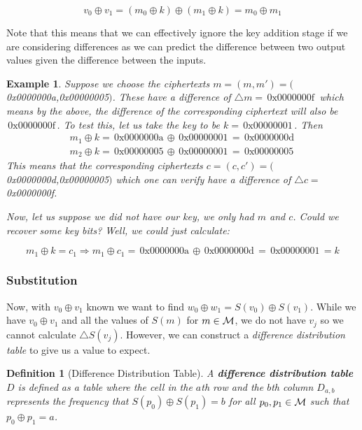 \documentclass[12pt,a4paper]{article}
\newtheorem{definition}[theorem]{Definition}
\newtheorem{example}[theorem]{Example}
\newenvironment{bigexample}{\begin{shadedbox}\begin{example}\normalfont}{\end{example}\end{shadedbox}}
\newcommand{\hex}[1] {0x#1}
\newcommand{\hexp}[1] {\,\text{0x#1}\,}
\begin{document}
\[v_0 \oplus v_1 = (m_0 \oplus k) \oplus (m_1 \oplus k)  = m_0 \oplus m_1
\]

Note that this means that we can effectively ignore the key addition stage if we are
considering differences as we can predict the difference
between two output values given the difference between the inputs. 

\begin{bigexample}
Suppose we choose the ciphertexts $m = (m,m') = ($\hex{0000000a},\hex{00000005}$)$. These have a
difference of $\triangle m = \hexp{0000000f}$ which means by the above, the difference of
the corresponding ciphertext will also be $\hexp{0000000f}$. To test this, let us take the
key to be $k=\hexp{00000001}$. Then 
\begin{align*}
m_1 \oplus k = \hexp{0000000a} \oplus \hexp{00000001} = \hexp{0000000d}\\
m_2 \oplus k =
\hexp{00000005} \oplus \hexp{00000001} = \hexp{00000005}
\end{align*}
This means that the corresponding ciphertexts $c = (c,c') = ($\hex{0000000d},\hex{00000005}$)$ which one can
verify have a difference of $\triangle c = $\hex{0000000f}.

Now, let us suppose we did not have our key, we only had $m$ and $c$. Could we
recover some key bits? Well, we could just calculate:

\[m_1 \oplus k = c_1 \Rightarrow m_1 \oplus c_1 = \hexp{0000000a} \oplus \hexp{0000000d} =
\hexp{00000001} = k\]
\end{bigexample}

\subsubsection{Substitution}

Now, with $v_0 \oplus v_1$ known we want to find $w_0 \oplus w_1 = S(v_0) \oplus
S(v_1)$. While we have $v_0 \oplus v_1$ and all the values of $S(m)$ for $m
\in \cal{M}$, we do not
have $v_j$ so we cannot calculate $\triangle S(v_j)$. However, we
can construct a \textit{difference distribution table} to give us a value to expect. 


\begin{definition}[Difference Distribution Table]
A \textbf{difference distribution table} $D$ is defined as a table where the
cell in the $a$th row and the $b$th column $D_{a,b}$ represents the frequency
that $S(p_0) \oplus S(p_1) = b$ for all $p_0,p_1 \in \cal{M}$ such that $p_0
\oplus p_1 = a$. 
\end{definition}
\end{document}
